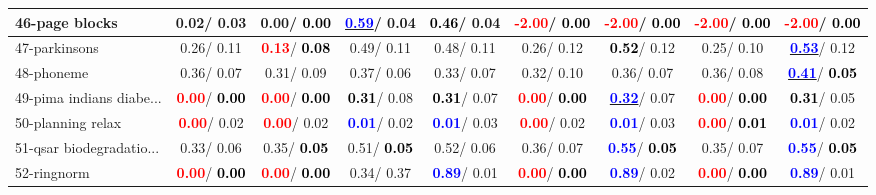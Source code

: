 \begin{table}[h]
\begin{center}
\begin{tabular}{lc|c|c|c|c|c|c|c}
46-page blocks &   0.02/  0.03 &   0.00/\textcolor{black}{\textbf{  0.00}} & \underline{\textcolor{blue}{\textbf{  0.59}}}/  0.04 & \textcolor{black}{\textbf{  0.46}}/  0.04 & \textcolor{red}{\textbf{ -2.00}}/\textcolor{black}{\textbf{  0.00}} & \textcolor{red}{\textbf{ -2.00}}/\textcolor{black}{\textbf{  0.00}} & \textcolor{red}{\textbf{ -2.00}}/\textcolor{black}{\textbf{  0.00}} & \textcolor{red}{\textbf{ -2.00}}/\textcolor{black}{\textbf{  0.00}} \\ \hline
47-parkinsons &   0.26/  0.11 & \textcolor{red}{\textbf{  0.13}}/\textcolor{black}{\textbf{  0.08}} &   0.49/  0.11 &   0.48/  0.11 &   0.26/  0.12 & \textcolor{black}{\textbf{  0.52}}/  0.12 &   0.25/  0.10 & \underline{\textcolor{blue}{\textbf{  0.53}}}/  0.12 \\
48-phoneme &   0.36/  0.07 &   0.31/  0.09 &   0.37/  0.06 &   0.33/  0.07 &   0.32/  0.10 &   0.36/  0.07 &   0.36/  0.08 & \underline{\textcolor{blue}{\textbf{  0.41}}}/\textcolor{black}{\textbf{  0.05}} \\
49-pima indians diabe... & \textcolor{red}{\textbf{  0.00}}/\textcolor{black}{\textbf{  0.00}} & \textcolor{red}{\textbf{  0.00}}/\textcolor{black}{\textbf{  0.00}} & \textcolor{black}{\textbf{  0.31}}/  0.08 & \textcolor{black}{\textbf{  0.31}}/  0.07 & \textcolor{red}{\textbf{  0.00}}/\textcolor{black}{\textbf{  0.00}} & \underline{\textcolor{blue}{\textbf{  0.32}}}/  0.07 & \textcolor{red}{\textbf{  0.00}}/\textcolor{black}{\textbf{  0.00}} & \textcolor{black}{\textbf{  0.31}}/  0.05 \\
50-planning relax & \textcolor{red}{\textbf{  0.00}}/  0.02 & \textcolor{red}{\textbf{  0.00}}/  0.02 & \textcolor{blue}{\textbf{  0.01}}/  0.02 & \textcolor{blue}{\textbf{  0.01}}/  0.03 & \textcolor{red}{\textbf{  0.00}}/  0.02 & \textcolor{blue}{\textbf{  0.01}}/  0.03 & \textcolor{red}{\textbf{  0.00}}/\textcolor{black}{\textbf{  0.01}} & \textcolor{blue}{\textbf{  0.01}}/  0.02 \\
51-qsar biodegradatio... &   0.33/  0.06 &   0.35/\textcolor{black}{\textbf{  0.05}} &   0.51/\textcolor{black}{\textbf{  0.05}} &   0.52/  0.06 &   0.36/  0.07 & \textcolor{blue}{\textbf{  0.55}}/\textcolor{black}{\textbf{  0.05}} &   0.35/  0.07 & \textcolor{blue}{\textbf{  0.55}}/\textcolor{black}{\textbf{  0.05}} \\
52-ringnorm & \textcolor{red}{\textbf{  0.00}}/\textcolor{black}{\textbf{  0.00}} & \textcolor{red}{\textbf{  0.00}}/\textcolor{black}{\textbf{  0.00}} &   0.34/  0.37 & \textcolor{blue}{\textbf{  0.89}}/  0.01 & \textcolor{red}{\textbf{  0.00}}/\textcolor{black}{\textbf{  0.00}} & \textcolor{blue}{\textbf{  0.89}}/  0.02 & \textcolor{red}{\textbf{  0.00}}/\textcolor{black}{\textbf{  0.00}} & \textcolor{blue}{\textbf{  0.89}}/  0.01 \\

\end{tabular}
\end{center}
\end{table}

